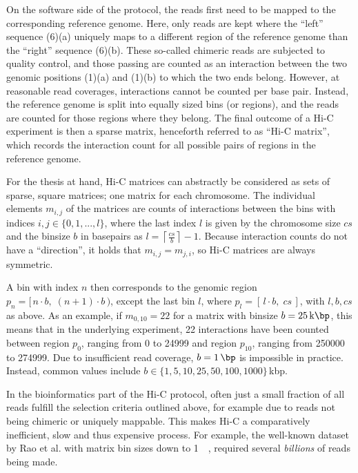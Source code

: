 On the software side of the protocol, the reads first need to be mapped 
to the corresponding reference genome.
Here, only reads are kept where the ``left'' sequence (6)(a)
uniquely maps to a different region of the reference genome than the ``right'' sequence (6)(b).
These so-called chimeric reads are subjected to quality control, and those passing are counted as an interaction
between the two genomic positions (1)(a) and (1)(b) to which the two ends belong.
However, at reasonable read coverages, interactions cannot be counted per base pair. 
Instead, the reference genome is split into equally sized bins (or regions), 
and the reads are counted for those regions where they belong. 
The final outcome of a Hi-C experiment is then a sparse matrix, henceforth referred to as ``Hi-C matrix'', 
which records the interaction count for all possible pairs of regions in the reference genome.

For the thesis at hand, Hi-C matrices can abstractly be considered as sets of sparse, square matrices; one matrix for each chromosome.
The individual elements $m_{i,j}$ of the matrices are counts of interactions between the bins with indices $i,j \in \{0,1,...,l\}$,
where the last index $l$ is given by the chromosome size $cs$ and the binsize $b$ in basepairs as $l=   \left \lceil{\frac{cs}{b}}\right \rceil -1$.
Because interaction counts do not have a ``direction'', it holds that $m_{i,j} = m_{j,i}$, so Hi-C matrices are always symmetric.

A bin with index $n$ then corresponds to the genomic region $p_n = [\,n\cdot b, \; (n+1)\cdot b\,)$, 
except the last bin $l$, where $p_{l} = [\,l \cdot b, \; cs \,]$, with $l,b,cs$ as above.
As an example, if $m_{0,10}=22$ for a matrix with binsize $b=\SI{25}{\kilo\bp}$, this means that in the underlying experiment, 
22 interactions have been counted between region $p_0$, ranging from 0 to \SI{24999}{\bp} and region $p_{10}$, 
ranging from 250000 to \SI{274999}{\bp}. 
Due to insufficient read coverage, $b=\SI{1}{\bp}$ is impossible in practice. 
Instead, common values include $b \in \{1, 5, 10, 25, 50, 100, 1000\}$\,kbp.

In the bioinformatics part of the Hi-C protocol, often just a small fraction of all reads 
fulfill the selection criteria outlined above, for example due to reads not being chimeric or uniquely mappable.
This makes Hi-C a comparatively inefficient, slow and thus expensive process.
For example, the well-known dataset by Rao et al. \cite{Rao2014} with matrix bin sizes down to \SI{1}{\kilo\bp}, required several \emph{billions} of reads being made. 

